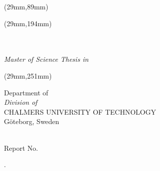 \begin{titlepage}
\begin{center}


\textblockorigin{0mm}{0mm} 
\begin{textblock*}{14cm}(29mm,89mm)
\end{textblock*}

\end{center}

\begin{textblock*}{14cm}(29mm,194mm)
\noindent
\raggedright
\huge{\thesistitle}\\ 
\vspace{0.0cm} 
\Large{\thesissubtitle}\\
\vspace{0.4cm} 
\large{\textit{Master of Science Thesis in \thesisprogram}}\\
\vspace{0.6cm}
\LARGE{\thesisauthor}
\end{textblock*}

\begin{textblock*}{14cm}(29mm,251mm)
\normalsize{
\noindent
\raggedright
Department of \thesisdepartment\\
\textit{Division of \thesisdivision}\\
CHALMERS UNIVERSITY OF TECHNOLOGY\\
G\"oteborg, Sweden \thesisyear}\\
Report No. \reportnumber
\end{textblock*}
.
\end{titlepage}